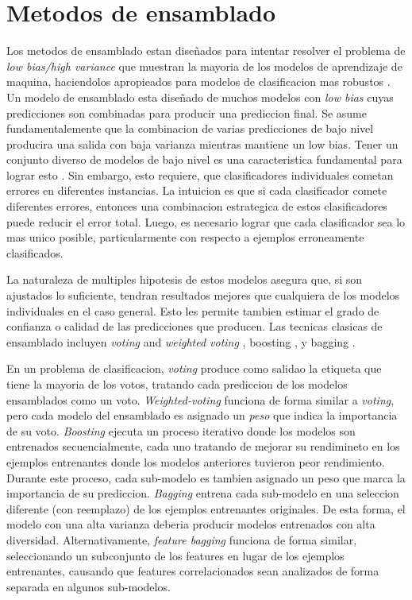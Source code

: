 
\section{Metodos de ensamblado}\label{section:ensembles}

Los metodos de ensamblado estan diseñados para intentar resolver el problema de \textit{low bias/high variance} que muestran la mayoria de los modelos de aprendizaje de maquina, haciendolos apropieados para modelos de clasificacion mas robustos \cite{polikar2006ensemble}. Un modelo de ensamblado esta diseñado de muchos modelos con \textit{low bias} cuyas predicciones son combinadas para producir una prediccion final. Se asume fundamentalemente que la combinacion de varias predicciones de bajo nivel producira una salida con baja varianza mientras mantiene un low bias. Tener un conjunto diverso de modelos de bajo nivel es una caracteristica fundamental para lograr esto \cite{polikar2006ensemble}. Sin embargo, esto requiere, que clasificadores individuales cometan errores en diferentes instancias. La intuicion es que si cada clasificador comete diferentes errores, entonces una combinacion estrategica de estos clasificadores puede reducir el error total. Luego, es necesario lograr que cada clasificador sea lo mas unico posible, particularmente con respecto a ejemplos erroneamente clasificados.

La naturaleza de multiples hipotesis de estos modelos asegura que, si son ajustados lo suficiente, tendran resultados mejores que cualquiera de los modelos individuales en el caso general. Esto les permite tambien estimar el grado de confianza o calidad de las predicciones que producen. Las tecnicas clasicas de ensamblado incluyen \textit{voting} and \textit{weighted voting} \cite{dietterich2000ensemble}, boosting \cite{schapire1990strength}, y bagging \cite{breiman1996bagging}.

En un problema de clasificacion, \textit{voting} produce como salidao la etiqueta que tiene la mayoria de los votos, tratando cada prediccion de los modelos ensamblados como un voto. \textit{Weighted-voting} funciona de forma similar a \textit{voting}, pero cada modelo del ensamblado es asignado un \textit{peso} que indica la importancia de su voto. \textit{Boosting} ejecuta un proceso iterativo donde los modelos son entrenados secuencialmente, cada uno tratando de mejorar su rendimineto en los ejemplos entrenantes donde los modelos anteriores tuvieron peor rendimiento. Durante este proceso, cada sub-modelo es tambien asignado un peso que marca la importancia de su prediccion. \textit{Bagging} entrena cada sub-modelo en una seleccion diferente (con reemplazo) de los ejemplos entrenantes originales. De esta forma, el modelo con una alta varianza deberia producir modelos entrenados con alta diversidad. Alternativamente, \textit{feature bagging} funciona de forma similar, seleccionando un subconjunto de los features en lugar de los ejemplos entrenantes, causando que features correlacionados sean analizados de forma separada en algunos sub-modelos.

